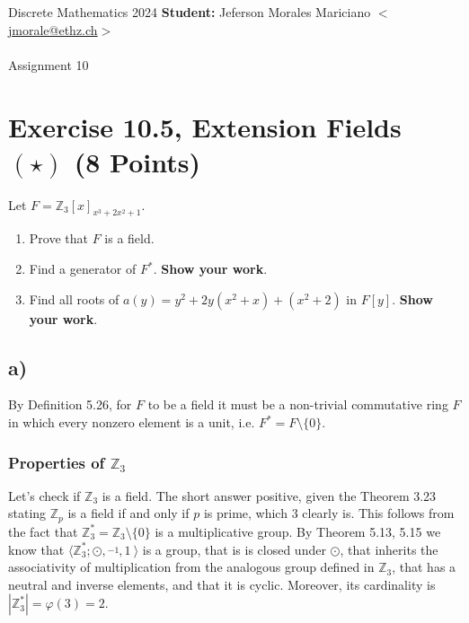 \documentclass[unicode,11pt,a4paper,oneside,numbers=endperiod,openany]{scrartcl}
\def\Z{\mathbb{Z}}
\newcommand{\Zgmult}[1]{\mathbb{Z}_{#1}^{\ast}}
\begin{document}
\setassignment
{}

\serieheader
{Discrete Mathematics}
{2024}
{%
\textbf{Student:} Jeferson Morales Mariciano 
\href{mailto:jmorale@ethz.ch}{\(<\)jmorale@ethz.ch\(>\)} \\\\}
{\vspace{-1cm}}%
{Assignment 10}{}

\section*{Exercise 10.5, Extension Fields \( (\star) \) \hfill (8 Points)}
Let \( F = \Z_3[x]_{x^3 + 2x^2 + 1} \).

\begin{enumerate}[label=\textbf{\alph*)}]
    \item 
    Prove that \( F \) is a field.

    \item 
    Find a generator of \( F^* \). \textbf{Show your work}.

    \item 
    Find all roots of \( a(y) = y^2 + 2y(x^2 + x) + (x^2 + 2) \) in \( F[y] \).
    \textbf{Show your work}.
\end{enumerate}

\subsection*{a)}

By Definition 5.26, for \( F \) to be a field it must be a non-trivial commutative ring
\( F \) in which every nonzero element is a unit, 
i.e. \( F^* = F \setminus \{ 0 \} \).

\subsubsection*{Properties of \( \Z_3 \) }
Let's check if \( \Z_3 \) is a field.
The short answer positive, given the Theorem 3.23 stating \( \Z_p \) is a field
if and only if \( p \) is prime, which \( 3 \) clearly is. 
This follows from the fact that \( \Zgmult{3} = \Z_3 \setminus \{ 0 \} \) 
is a multiplicative group. 
By Theorem 5.13, 5.15 we know that \( \langle \Zgmult{3}; \odot, \overset{-1}{\ }, 1 \ \rangle \) 
is a group, 
that is is closed under \( \odot \), 
that inherits the associativity of multiplication from the analogous group defined in \( \Z_3 \),
that has a neutral and inverse elements,
and that it is cyclic.
Moreover, its cardinality is \( | \Zgmult{3} | = \varphi(3) = 2 \).
\end{document}
